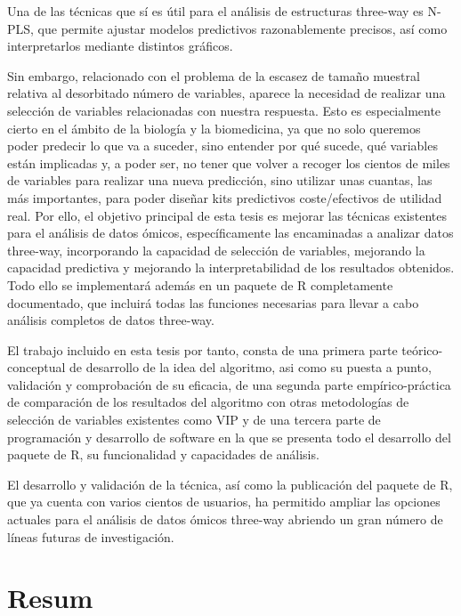 Una de las técnicas que sí es útil para el análisis de estructuras three-way es N-PLS, que permite ajustar modelos predictivos razonablemente precisos, así como interpretarlos mediante distintos gráficos.

Sin embargo, relacionado con el problema de la escasez de tamaño muestral relativa al desorbitado número de variables, aparece la necesidad de realizar una selección de variables relacionadas con nuestra respuesta. Esto es especialmente cierto en el ámbito de la biología y la biomedicina, ya que no solo queremos poder predecir lo que va a suceder, sino entender por qué sucede, qué variables están implicadas y, a poder ser, no tener que volver a recoger los cientos de miles de variables para realizar una nueva predicción, sino utilizar unas cuantas, las más importantes, para poder diseñar kits predictivos coste/efectivos de utilidad real. Por ello, el objetivo principal de esta tesis es mejorar las técnicas existentes para el análisis de datos ómicos, específicamente las encaminadas a analizar datos three-way, incorporando la capacidad de selección de variables, mejorando la capacidad predictiva y mejorando la interpretabilidad de los resultados obtenidos. Todo ello se implementará además en un paquete de R completamente documentado, que incluirá todas las funciones necesarias para llevar a cabo análisis completos de datos three-way. 

El trabajo incluido en esta tesis por tanto, consta de una primera parte teórico-conceptual de desarrollo de la idea del algoritmo, asi como su puesta a punto, validación y comprobación de su eficacia, de una segunda parte empírico-práctica de comparación de los resultados del algoritmo con otras metodologías de selección de variables existentes como VIP y de una tercera parte de programación y desarrollo de software en la que se presenta todo el desarrollo del paquete de R, su funcionalidad y capacidades de análisis. 

El desarrollo y validación de la técnica, así como la publicación del paquete de R, que ya cuenta con varios cientos de usuarios, ha permitido ampliar las opciones actuales para el análisis de datos ómicos three-way  abriendo un gran número de líneas futuras de investigación.


\ifEBOOKPDF
	\bigskip
\else
	\vfill
\fi


\chapter*{Resum}

